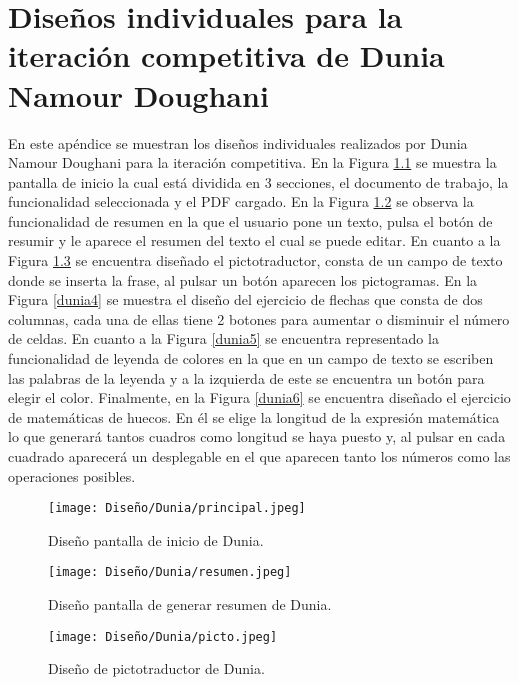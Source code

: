 \chapter{Diseños individuales para la iteración competitiva de Dunia Namour Doughani}
\label{ape:disenyoDunia}

En este apéndice se muestran los diseños individuales realizados por Dunia Namour Doughani para la iteración competitiva. En la Figura \ref{dunia1} se muestra la pantalla de inicio la cual está dividida en 3 secciones, el documento de trabajo, la funcionalidad seleccionada y el PDF cargado. En la Figura \ref{dunia2} se observa la funcionalidad de resumen en la que el usuario pone un texto, pulsa el botón de resumir y le aparece el resumen del texto el cual se puede editar. En cuanto a la Figura \ref{dunia3} se encuentra diseñado el pictotraductor, consta de un campo de texto donde se inserta la frase, al pulsar un botón aparecen los pictogramas. En la Figura \ref{dunia4} se muestra el diseño del ejercicio de flechas que consta de dos columnas, cada una de ellas tiene 2 botones para aumentar o disminuir el número de celdas. En cuanto a la Figura \ref{dunia5} se encuentra representado la funcionalidad de leyenda de colores en la que en un campo de texto se escriben las palabras de la leyenda y a la izquierda de este se encuentra un botón para elegir el color. Finalmente, en la Figura \ref{dunia6} se encuentra diseñado el ejercicio de matemáticas de huecos. En él se elige la longitud de la expresión matemática lo que generará tantos cuadros como longitud se haya puesto y, al pulsar en cada cuadrado aparecerá un desplegable en el que aparecen tanto los números como las operaciones posibles. 

  \begin{figure}[ht!]
    \centering
    \texttt{[image: Diseño/Dunia/principal.jpeg]}
    \caption{Diseño pantalla de inicio de Dunia.}
    \label{dunia1}
  \end{figure}

  \begin{figure}[ht!]
    \centering
    \texttt{[image: Diseño/Dunia/resumen.jpeg]}
    \caption{Diseño pantalla de generar resumen de Dunia.}
    \label{dunia2}
  \end{figure}

  \begin{figure}[ht!]
    \centering
    \texttt{[image: Diseño/Dunia/picto.jpeg]}
    \caption{Diseño de pictotraductor de Dunia.}
    \label{dunia3}
  \end{figure}

